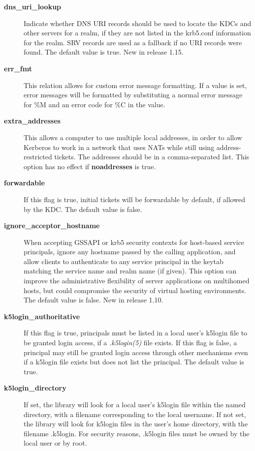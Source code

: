 \documentclass[letterpaper,10pt,english]{sphinxmanual}
\begin{document}
\begin{description}
\item[{\textbf{dns\_uri\_lookup}}] \leavevmode
Indicate whether DNS URI records should be used to locate the KDCs
and other servers for a realm, if they are not listed in the
krb5.conf information for the realm.  SRV records are used as a
fallback if no URI records were found.  The default value is true.
New in release 1.15.

\item[{\textbf{err\_fmt}}] \leavevmode
This relation allows for custom error message formatting.  If a
value is set, error messages will be formatted by substituting a
normal error message for \%M and an error code for \%C in the value.

\item[{\textbf{extra\_addresses}}] \leavevmode
This allows a computer to use multiple local addresses, in order
to allow Kerberos to work in a network that uses NATs while still
using address-restricted tickets.  The addresses should be in a
comma-separated list.  This option has no effect if
\textbf{noaddresses} is true.

\item[{\textbf{forwardable}}] \leavevmode
If this flag is true, initial tickets will be forwardable by
default, if allowed by the KDC.  The default value is false.

\item[{\textbf{ignore\_acceptor\_hostname}}] \leavevmode
When accepting GSSAPI or krb5 security contexts for host-based
service principals, ignore any hostname passed by the calling
application, and allow clients to authenticate to any service
principal in the keytab matching the service name and realm name
(if given).  This option can improve the administrative
flexibility of server applications on multihomed hosts, but could
compromise the security of virtual hosting environments.  The
default value is false.  New in release 1.10.

\item[{\textbf{k5login\_authoritative}}] \leavevmode
If this flag is true, principals must be listed in a local user's
k5login file to be granted login access, if a \emph{.k5login(5)}
file exists.  If this flag is false, a principal may still be
granted login access through other mechanisms even if a k5login
file exists but does not list the principal.  The default value is
true.

\item[{\textbf{k5login\_directory}}] \leavevmode
If set, the library will look for a local user's k5login file
within the named directory, with a filename corresponding to the
local username.  If not set, the library will look for k5login
files in the user's home directory, with the filename .k5login.
For security reasons, .k5login files must be owned by
the local user or by root.


\end{description}
\end{document}
